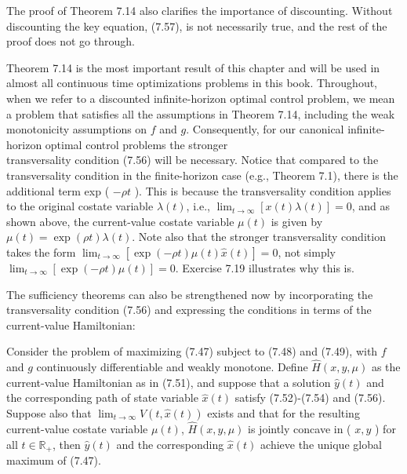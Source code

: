 \documentclass[\topdir/lecture_notes.tex]{subfiles}
\begin{document}
The proof of Theorem 7.14 also clarifies the importance of discounting. Without discounting the key equation, (7.57), is not necessarily true, and the rest of the proof does not go through.

Theorem 7.14 is the most important result of this chapter and will be used in almost all continuous time optimizations problems in this book. Throughout, when we refer to a discounted infinite-horizon optimal control problem, we mean a problem that satisfies all the assumptions in Theorem 7.14, including the weak monotonicity assumptions on $f$ and $g$. Consequently, for our canonical infinite-horizon optimal control problems the stronger\\
transversality condition (7.56) will be necessary. Notice that compared to the transversality condition in the finite-horizon case (e.g., Theorem 7.1), there is the additional term exp ( $-\rho t$ ). This is because the transversality condition applies to the original costate variable $\lambda(t)$, i.e., $\lim _{t \rightarrow \infty}[x(t) \lambda(t)]=0$, and as shown above, the current-value costate variable $\mu(t)$ is given by $\mu(t)=\exp (\rho t) \lambda(t)$. Note also that the stronger transversality condition takes the form $\lim _{t \rightarrow \infty}[\exp (-\rho t) \mu(t) \hat{x}(t)]=0$, not simply $\lim _{t \rightarrow \infty}[\exp (-\rho t) \mu(t)]=0$. Exercise 7.19 illustrates why this is.

The sufficiency theorems can also be strengthened now by incorporating the transversality condition (7.56) and expressing the conditions in terms of the current-value Hamiltonian:

\begin{theorem}
Consider the problem of maximizing (7.47) subject to (7.48) and (7.49), with $f$ and $g$ continuously differentiable and weakly monotone. Define $\hat{H}(x, y, \mu)$ as the current-value Hamiltonian as in (7.51), and suppose that a solution $\hat{y}(t)$ and the corresponding path of state variable $\hat{x}(t)$ satisfy (7.52)-(7.54) and (7.56). Suppose also that $\lim _{t \rightarrow \infty} V(t, \hat{x}(t))$ exists and that for the resulting current-value costate variable $\mu(t)$, $\hat{H}(x, y, \mu)$ is jointly concave in ( $x, y$ ) for all $t \in \mathbb{R}_{+}$, then $\hat{y}(t)$ and the corresponding $\hat{x}(t)$ achieve the unique global maximum of (7.47).
\end{theorem}
\end{document}
